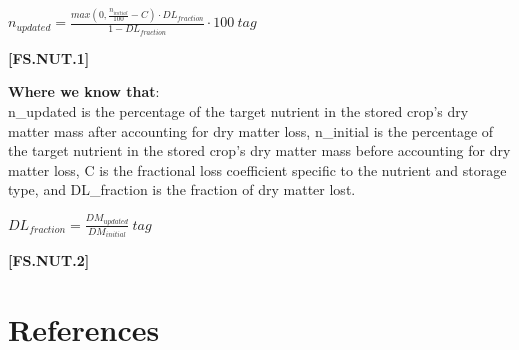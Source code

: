 \begin{refsection}
        \begin{center}
        \(n_{updated} = \frac{max(0, \frac{n_{initial}}{100} - C) \cdot DL_{fraction}}{1 - DL_{fraction}} \cdot 100 \ tag\)
    \end{center}
        \vspace{0.5cm}
    
            {\raggedleft \textbf{[FS.NUT.1]}\par}
        \vspace{0.5cm}

\textbf{Where we know that}: \\ n\_updated is the percentage of the target nutrient in the stored crop’s dry matter mass after accounting for dry matter loss, n\_initial is the percentage of the target nutrient in the stored crop’s dry matter mass before accounting for dry matter loss, C is the fractional loss coefficient specific to the nutrient and storage type, and DL\_fraction is the fraction of dry matter lost.
\vspace{0.2cm}

        \begin{center}
        \(DL_{fraction} = \frac{DM_{updated}}{DM_{initial}} \ tag\)
    \end{center}
        \vspace{0.5cm}
    
            {\raggedleft \textbf{[FS.NUT.2]}\par}
        \vspace{0.5cm}







\newpage
\section{References}
\printbibliography[heading=subbibliography,title={Feed Storage Module}]
\end{refsection}